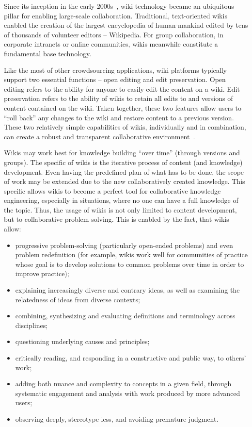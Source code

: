 \documentclass[PhD, Submit, ngerman,UKenglish,table]{scrbook}
\begin{document}
Since its inception in the early 2000s~\cite{LeufCunningham2001}, wiki technology became an ubiquitous pillar for enabling large-scale collaboration.
Traditional, text-oriented wikis enabled the creation of the largest encyclopedia of human-mankind edited by tens of thousands of volunteer editors -- Wikipedia.
For group collaboration, in corporate intranets or online communities, wikis meanwhile constitute a fundamental base technology.

Like the most of other crowdsourcing applications, wiki platforms typically support two essential functions – open editing and edit preservation.
Open editing refers to the ability for anyone to easily edit the content on a wiki.
Edit preservation refers to the ability of wikis to retain all edits to and versions of content contained on the wiki.
Taken together, these two features allow users to ``roll back'' any changes to the wiki and restore content to a previous version.
These two relatively simple capabilities of wikis, individually and in combination, can create a robust and transparent collaborative environment~\cite{kane2009shoemaker}.

Wikis may work best for knowledge building “over time” (through
versions and groups).
The specific of wikis is the iterative process of content (and knowledge) development.
Even having the predefined plan of what has to be done, the scope of work may be extended due to the new collaboratively created knowledge. 
This specific allows wikis to become a perfect tool for collaborative knowledge engineering, especially in situations, where no one can have a full knowledge of the topic.
Thus, the usage of wikis is not only limited to content development, but to collaborative problem solving.
This is enabled by the fact, that wikis allow:
 
\begin{itemize}
\item progressive problem-solving (particularly open-ended problems) and even problem redefinition
(for example, wikis work well for communities of practice whose goal is to develop solutions to common problems over time in order to improve practice);
\item explaining increasingly diverse and contrary ideas, as well as examining the relatedness of ideas from diverse contexts;
\item combining, synthesizing and evaluating definitions and terminology across disciplines;
\item questioning underlying causes and principles;
\item critically reading, and responding in a constructive and public way, to others' work;
\item adding both nuance and complexity to concepts in a given field, through systematic engagement and analysis with work produced by more advanced users;
\item observing deeply, stereotype less, and avoiding premature judgment.

\end{itemize}
\end{document}

